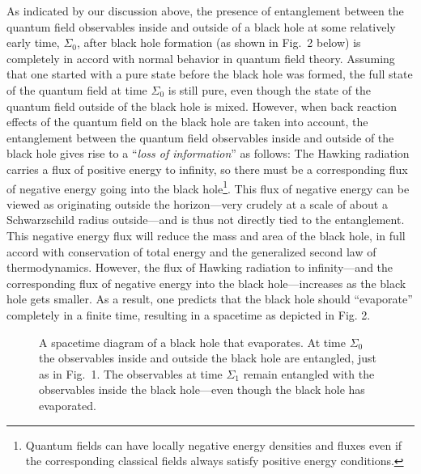 \documentclass[12pt,nofootinbib,amsmath,amssymb,amsfonts,aps,prd,groupedaddress]{revtex4-1}
\begin{document}
As indicated by our discussion above, the presence of entanglement between the
quantum field observables inside and outside of a black hole at some relatively early time,
$\Sigma_0$, after black hole formation (as
shown in Fig.~2 below) is completely in accord with normal behavior in quantum field theory.
Assuming that one started with a pure state before the black hole was formed,
the full state of the quantum field at time $\Sigma_0$ is still pure, even
though the state of the quantum field outside of the black hole is mixed.
However, when back reaction effects of the quantum field on the black hole are
taken into account, the entanglement between the quantum field observables
inside and outside of the black hole gives rise to a ``{\it loss of
information}'' as follows: The Hawking radiation carries a flux of positive
energy to infinity, so there must be a corresponding flux of negative energy
going into the black hole\footnote{Quantum fields can have locally negative
energy densities and fluxes even if the corresponding classical fields always
satisfy positive energy conditions.}. This flux of negative energy can be viewed as 
originating outside the horizon---very crudely
at a scale of about a Schwarzschild radius outside---and is thus not directly tied to the entanglement.
This negative energy flux will reduce the
mass and area of the black hole, in full accord with conservation of total
energy and the generalized second law of thermodynamics. However, the flux of
Hawking radiation to infinity---and the corresponding flux of negative energy
into the black hole---increases as the black hole gets smaller. As a result, one
predicts that the black hole should ``evaporate'' completely in a finite time,
resulting in a spacetime as depicted in Fig. 2. 
\begin{figure}[ht]
\centering
{}
\caption{A spacetime diagram of a black hole that evaporates. At time $\Sigma_0$ the observables 
inside and outside the black hole are entangled, just as in Fig.~1. The observables at time $\Sigma_1$ remain entangled with the observables inside the black hole---even though the black hole has evaporated.}
\end{figure}
\end{document}
